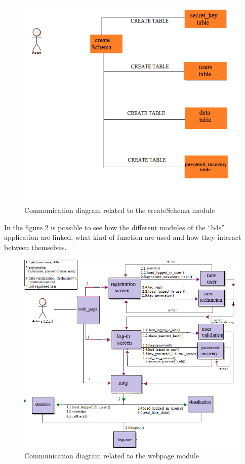 \documentclass{article}
\begin{document}
\begin{figure}[H]
    \centering
    \includegraphics[width=0.65\linewidth]{image/COMM_TAB.png}
    \caption{Communication diagram related to the createSchema module}
    \label{fig:createSchema}
\end{figure}
In the figure \ref{fig:webpage} is possible to see how the different modules of the “b4s” application are linked, what kind of function are used and how they interact between themselves.

\begin{figure}[H]
    \centering
    \includegraphics[width=0.75\linewidth]{image/comunication_architecture.png}
    \caption{Communication diagram related to the webpage module}
    \label{fig:webpage}
\end{figure}
\end{document}
